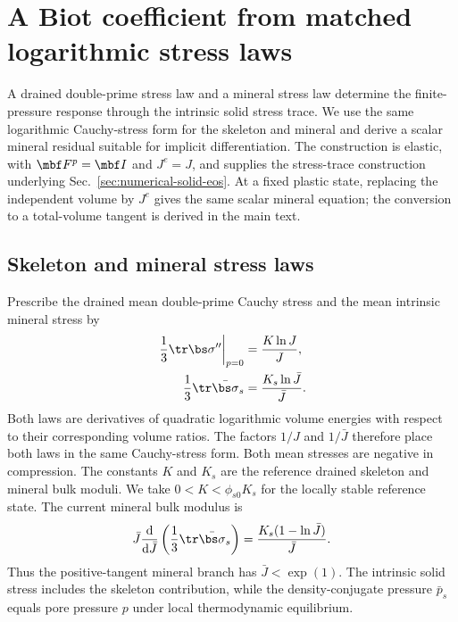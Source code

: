 \section{A Biot coefficient from matched logarithmic stress laws}
\label{sec:stress-trace-biot-construction}

A drained double-prime stress law and a mineral stress law determine the
finite-pressure response through the intrinsic solid stress trace.  We use
the same logarithmic Cauchy-stress form for the skeleton and mineral and derive a
scalar mineral residual suitable for implicit differentiation.  The
construction is elastic, with \(\mbf F^p=\mbf I\) and \(J^e=J\), and supplies the stress-trace construction underlying
Sec.~\ref{sec:numerical-solid-eos}.  At a fixed plastic state, replacing the
independent volume by \(J^e\) gives the same scalar mineral equation; the
conversion to a total-volume tangent is derived in the main text.

\subsection{Skeleton and mineral stress laws}

Prescribe the drained mean double-prime Cauchy stress and the
mean intrinsic mineral stress by
\begin{align}
 \left.\frac13\tr\bs\sigma^{\prime\prime}\right|_{p=0}
 &=\frac{K\ln J}{J},
 \label{eq:trace-drained-skeleton-stress}\\
 \frac13\tr\bar{\bs\sigma}_s
 &=\frac{K_s\ln\bar J}{\bar J}.
 \label{eq:trace-grain-eos-volume-form}
\end{align}
Both laws are derivatives of quadratic logarithmic volume energies with
respect to their corresponding volume ratios.  The factors \(1/J\) and
\(1/\bar J\) therefore place both laws in the same Cauchy-stress form.
Both mean stresses are negative in compression.  The constants \(K\) and \(K_s\) are the reference drained skeleton and mineral
bulk moduli.  We take \(0<K<\phi_{s0}K_s\) for the locally stable reference
state.  The current mineral bulk modulus is
\begin{equation}
 \bar J\frac{\mathrm d}{\mathrm d\bar J}
 \left(\frac13\tr\bar{\bs\sigma}_s\right)
 =\frac{K_s(1-\ln\bar J)}{\bar J}.
 \label{eq:trace-current-mineral-modulus}
\end{equation}
Thus the positive-tangent mineral branch has \(\bar J<\exp(1)\).
The intrinsic solid stress includes the skeleton contribution, while the
density-conjugate pressure \(\bar p_s\) equals pore pressure \(p\) under
local thermodynamic equilibrium.

